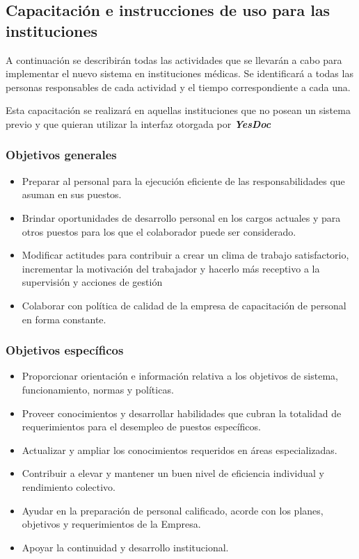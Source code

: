 \documentclass[a4paper,12pt]{article}
\begin{document}
\subsection{Capacitación e instrucciones de uso para las instituciones}

A continuación se describirán todas las actividades que se llevarán a cabo para implementar el nuevo sistema en instituciones médicas. Se identificará a todas las personas responsables de cada actividad  y el tiempo correspondiente a cada una. 

Esta capacitación se realizará en aquellas instituciones que no posean un sistema previo y que quieran utilizar la interfaz otorgada por \textbf{\emph{YesDoc}}




\subsubsection{Objetivos generales}
\begin{itemize}
	\item Preparar al personal para la ejecución eficiente de las responsabilidades que
	asuman en sus puestos.
	\item Brindar oportunidades de desarrollo personal en los cargos actuales y para
	otros puestos para los que el colaborador puede ser considerado.
	\item Modificar actitudes para contribuir a crear un clima de trabajo satisfactorio,
	incrementar la motivación del trabajador y hacerlo más receptivo a la
	supervisión y acciones de gestión
	\item Colaborar con política de calidad de la empresa de capacitación de personal
	en forma constante.
\end{itemize}

\subsubsection{Objetivos específicos}
\begin{itemize}
	\item Proporcionar orientación e información relativa a los objetivos de sistema, funcionamiento, normas y políticas.
	\item Proveer conocimientos y desarrollar habilidades que cubran la totalidad de
	requerimientos para el desempleo de puestos específicos.
	\item  Actualizar y ampliar los conocimientos requeridos en áreas especializadas.
	\item Contribuir a elevar y mantener un buen nivel de eficiencia individual y
	rendimiento colectivo.
	\item  Ayudar en la preparación de personal calificado, acorde con los planes,
	objetivos y requerimientos de la Empresa.
	\item  Apoyar la continuidad y desarrollo institucional.
\end{itemize}
\end{document}
